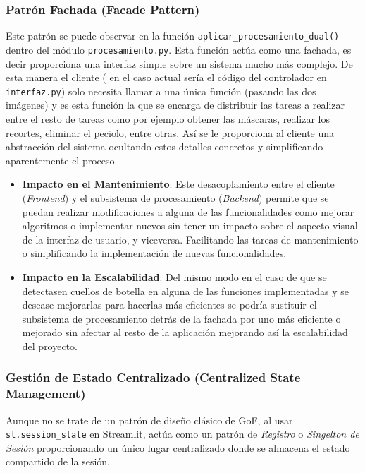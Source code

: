 \subsubsection{Patrón Fachada (Facade Pattern)}
Este patrón se puede observar en la función \verb|aplicar_procesamiento_dual()| dentro del módulo \texttt{procesamiento.py}. Esta función actúa como una fachada, es decir proporciona una interfaz simple sobre un sistema mucho más complejo. De esta manera el cliente ( en el caso actual sería el código del controlador en \texttt{interfaz.py}) solo necesita llamar a una única función (pasando las dos imágenes) y es esta función la que se encarga de distribuir las tareas a realizar entre el resto de tareas como por ejemplo obtener las máscaras, realizar los recortes, eliminar el peciolo, entre otras. Así se le proporciona al cliente una abstracción del sistema ocultando estos detalles concretos y simplificando aparentemente el proceso.

\begin{itemize}
    \item \textbf{Impacto en el Mantenimiento}: Este desacoplamiento entre el cliente (\textit{Frontend}) y el subsistema de procesamiento (\textit{Backend}) permite que se puedan realizar modificaciones a alguna de las funcionalidades como mejorar algoritmos o implementar nuevos sin tener un impacto sobre el aspecto visual de la interfaz de usuario, y viceversa. Facilitando las tareas de mantenimiento o simplificando la implementación de nuevas funcionalidades.

    \item \textbf{Impacto en la Escalabilidad}: Del mismo modo en el caso de que se detectasen cuellos de botella en alguna de las funciones implementadas y se desease mejorarlas para hacerlas más eficientes se podría sustituir el subsistema de procesamiento detrás de la fachada por uno más eficiente o mejorado sin afectar al resto de la aplicación mejorando así la escalabilidad del proyecto.
\end{itemize}

\subsubsection{Gestión de Estado Centralizado (Centralized State Management)}
Aunque no se trate de un patrón de diseño clásico de GoF, al usar \verb|st.session_state| en Streamlit, actúa como un patrón de \textit{Registro} o \textit{Singelton de Sesión} proporcionando un único lugar centralizado donde se almacena el estado compartido de la sesión.


